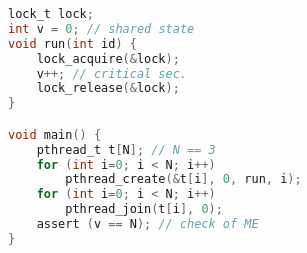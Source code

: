 \begin{lstlisting}[language=C, style=compact]
lock_t lock;
int v = 0; // shared state
void run(int id) {
    lock_acquire(&lock);
    v++; // critical sec.
    lock_release(&lock);
}

void main() {
    pthread_t t[N]; // N == 3
    for (int i=0; i < N; i++)
        pthread_create(&t[i], 0, run, i);
    for (int i=0; i < N; i++)
        pthread_join(t[i], 0);
    assert (v == N); // check of ME
}
\end{lstlisting}

%
